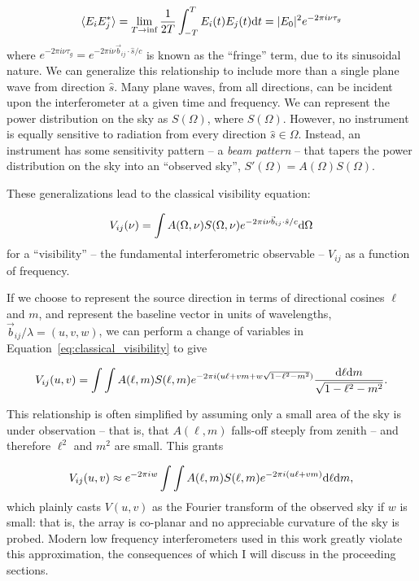 \begin{equation}
\langle E_i E_j^* \rangle 
= \lim_{T\rightarrow\inf}\frac{1}{2T}\int^T_{-T} E_i(t) E_j(t) {\rm d}t
= | E_0 |^2 e^{-2\pi i \nu \tau_g}
\label{eq:vis_time_integration}
\end{equation}
where $e^{-2\pi i \nu \tau_g} = e^{-2\pi i \nu \vec{b}_{ij}\cdot\hat{s}/c}$ is known as the ``fringe'' term, due to its sinusoidal nature. We can generalize this relationship to include more than a single plane wave from direction $\hat{s}$. Many plane waves, from all directions, can be incident upon the interferometer at a given time and frequency. We can represent the power distribution on the sky as $S(\Omega)$, where $S(\Omega)$. However, no instrument is equally sensitive to radiation from every direction $\hat{s} \in \Omega$. Instead, an instrument has some sensitivity pattern -- a \textit{beam pattern} -- that tapers the power distribution on the sky into an ``observed sky'',  $S'(\Omega) = A(\Omega)S(\Omega)$. 

These generalizations lead to the classical visibility equation:

\begin{equation}
V_{ij}(\nu) = \int A(\Omega, \nu) S(\Omega, \nu) e^{-2\pi i \nu \vec{b}_{ij}\cdot\hat{s}/c} {\rm d}\Omega
\label{eq:classical_visibility}
\end{equation}
for a ``visibility'' -- the fundamental interferometric observable -- $V_{ij}$ as a function of frequency.

If we choose to represent the source direction in terms of directional cosines $\ell$ and $m$, and represent the baseline vector in units of wavelengths, $\vec{b}_{ij}/\lambda=(u,v,w)$, we can perform a change of variables in Equation~\ref{eq:classical_visibility} to give

\begin{equation}
V_{ij}(u,v) = \int\int A(\ell, m)S(\ell, m) e^{-2\pi i (u\ell + vm + w\sqrt{1 - \ell^2 - m^2})} \frac{ {\rm d}\ell {\rm d}m }{\sqrt{1 - \ell^2 - m^2}}.
\label{eq:vis_def_widefield}
\end{equation}

This relationship is often simplified by assuming only a small area of the sky is under observation -- that is, that $A(\ell,m)$ falls-off steeply from zenith -- and therefore $\ell^2$ and $m^2$ are small. This grants

\begin{equation}
V_{ij}(u,v) \approx e^{-2\pi i w} \int\int A(\ell, m)S(\ell, m) e^{-2\pi i (u\ell + vm)} {\rm d}\ell {\rm d}m,
\label{eq:vis_dev_narrowfield}
\end{equation}
which plainly casts $V(u,v)$ as the Fourier transform of the observed sky if $w$ is small: that is, the array is co-planar and no appreciable curvature of the sky is probed. Modern low frequency interferometers used in this work greatly violate this approximation, the consequences of which I will discuss in the proceeding sections.

